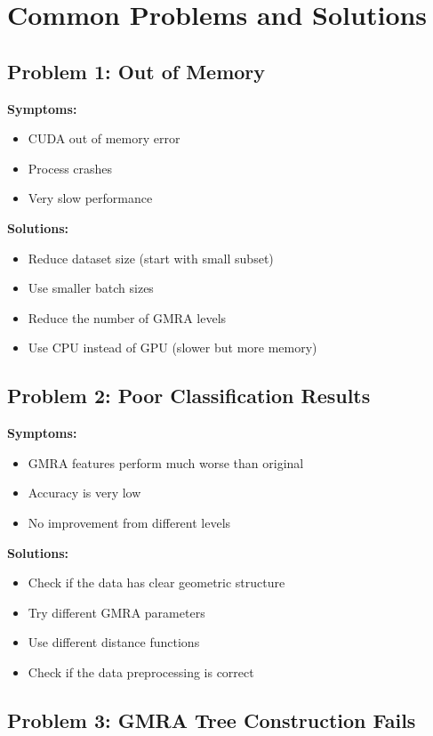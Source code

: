 \documentclass[12pt]{article}
\begin{document}
\section{Common Problems and Solutions}

\subsection{Problem 1: Out of Memory}

\textbf{Symptoms:}
\begin{itemize}
    \item CUDA out of memory error
    \item Process crashes
    \item Very slow performance
\end{itemize}

\textbf{Solutions:}
\begin{itemize}
    \item Reduce dataset size (start with small subset)
    \item Use smaller batch sizes
    \item Reduce the number of GMRA levels
    \item Use CPU instead of GPU (slower but more memory)
\end{itemize}

\subsection{Problem 2: Poor Classification Results}

\textbf{Symptoms:}
\begin{itemize}
    \item GMRA features perform much worse than original
    \item Accuracy is very low
    \item No improvement from different levels
\end{itemize}

\textbf{Solutions:}
\begin{itemize}
    \item Check if the data has clear geometric structure
    \item Try different GMRA parameters
    \item Use different distance functions
    \item Check if the data preprocessing is correct
\end{itemize}

\subsection{Problem 3: GMRA Tree Construction Fails}
\end{document}
